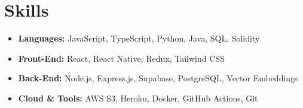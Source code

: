 \documentclass[11pt]{article}
\begin{document}
\section*{Skills}
\begin{itemize}[leftmargin=*, nosep, itemsep=2pt]
    \item \textbf{Languages:} JavaScript, TypeScript, Python, Java, SQL, Solidity
    \item \textbf{Front-End:} React, React Native, Redux, Tailwind CSS
    \item \textbf{Back-End:} Node.js, Express.js, Supabase, PostgreSQL, Vector Embeddings
    \item \textbf{Cloud \& Tools:} AWS S3, Heroku, Docker, GitHub Actions, Git
\end{itemize}
\end{document}

